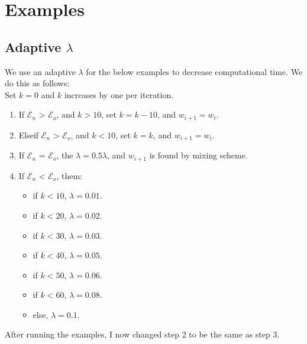 \documentclass[11pt, a4paper]{article}
\theoremstyle{definition}
\begin{document}
	\section{Examples}
	\subsection{Adaptive $\lambda$}
	We use an adaptive $\lambda$ for the below examples to decrease computational time. We do this as follows:\\
	Set $k = 0$ and $k$ increases by one per iteration.
	\begin{enumerate}
		\item If $\mathcal{E}_n$ > $\mathcal{E}_o$, and $k > 10$, set $k = k -10$, and $w_{i+1} = w_i$.
		\item Elseif $\mathcal{E}_n$ > $\mathcal{E}_o$, and $k < 10$, set $k = k$, and $w_{i+1} = w_i$.
		\item If $\mathcal{E}_n$ = $\mathcal{E}_o$, the $\lambda = 0.5\lambda$, and $w_{i+1}$ is found by mixing scheme.
		\item If $\mathcal{E}_n$ < $\mathcal{E}_o$, them:
		\begin{itemize}
			\item if $k < 10$, $\lambda = 0.01$.
			\item if $k < 20$, $\lambda = 0.02$.
			\item if $k < 30$, $\lambda = 0.03$.
			\item if $k < 40$, $\lambda = 0.05$.
			\item if $k < 50$, $\lambda = 0.06$.
			\item if $k < 60$, $\lambda = 0.08$.
			\item else, $\lambda = 0.1$.
		\end{itemize}
	\end{enumerate}
After running the examples, I now changed step 2 to be the same as step 3.
\end{document}
